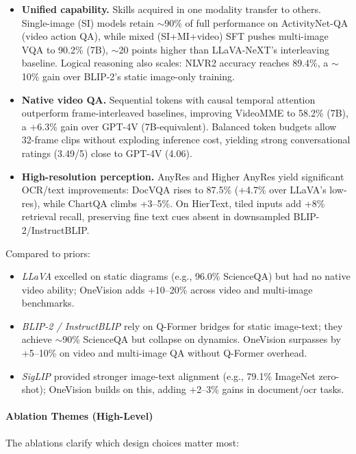 \begin{enrichment}
\begin{enrichment}
        \begin{itemize}
            \item \textbf{Unified capability.} Skills acquired in one modality transfer to others. Single-image (SI) models retain $\sim$90\% of full performance on ActivityNet-QA (video action QA), while mixed (SI+MI+video) SFT pushes multi-image VQA to 90.2\% (7B), $\sim$20 points higher than LLaVA-NeXT's interleaving baseline. Logical reasoning also scales: NLVR2 accuracy reaches 89.4\%, a $\sim$10\% gain over BLIP-2’s static image-only training.
            \item \textbf{Native video QA.} Sequential tokens with causal temporal attention outperform frame-interleaved baselines, improving VideoMME to 58.2\% (7B), a +6.3\% gain over GPT-4V (7B-equivalent). Balanced token budgets allow 32-frame clips without exploding inference cost, yielding strong conversational ratings (3.49/5) close to GPT-4V (4.06).
            \item \textbf{High-resolution perception.} AnyRes and Higher AnyRes yield significant OCR/text improvements: DocVQA rises to 87.5\% (+4.7\% over LLaVA’s low-res), while ChartQA climbs +3--5\%. On HierText, tiled inputs add +8\% retrieval recall, preserving fine text cues absent in downsampled BLIP-2/InstructBLIP.
        \end{itemize}
        
        Compared to priors:  
        \begin{itemize}
            \item \emph{LLaVA} excelled on static diagrams (e.g., 96.0\% ScienceQA) but had no native video ability; OneVision adds +10--20\% across video and multi-image benchmarks.  
            \item \emph{BLIP-2 / InstructBLIP} rely on Q-Former bridges for static image-text; they achieve $\sim$90\% ScienceQA but collapse on dynamics. OneVision surpasses by +5--10\% on video and multi-image QA without Q-Former overhead.  
            \item \emph{SigLIP} provided stronger image-text alignment (e.g., 79.1\% ImageNet zero-shot); OneVision builds on this, adding +2--3\% gains in document/ocr tasks.  
        \end{itemize}
        
        \newpage
        
        \paragraph{Ablation Themes (High-Level)}
        The ablations clarify which design choices matter most:
        

\end{enrichment}
\end{enrichment}
